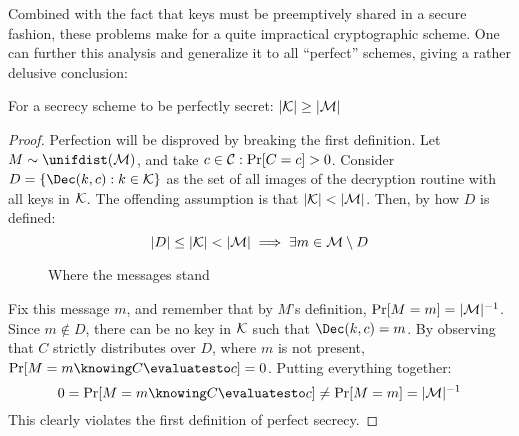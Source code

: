 
Combined with the fact that keys must be preemptively shared in a secure fashion, these problems make for a quite impractical cryptographic scheme. One can further this analysis and generalize it to all ``perfect'' schemes, giving a rather delusive conclusion:

\begin{theorem}
    For a secrecy scheme to be perfectly secret: $|\mathcal{K}| \geq |\mathcal{M}|$
\end{theorem}
\begin{proof}
    Perfection will be disproved by breaking the first definition. Let $M \sim \unifdist(\M)$, and take $c \in \mathcal{C} : \Pr[C = c] > 0$. Consider $D = \{\Dec(k, c) : k \in \K\}$ as the set of all images of the decryption routine with all keys in $\mathcal{K}$. The offending assumption is that $|\mathcal{K}| < |\mathcal{M}|$. Then, by how $D$ is defined:
    \[
        |D| \leq |\mathcal{K}| < |\mathcal{M}| \implies \exists m \in \mathcal{M} \setminus D
    \]

    \begin{figure}[h]
        \centering
        \def\firstcircle{(0,0) circle (1.5cm)}
        \def\secondcircle{(60:0) circle (0.9cm)}
        \caption{Where the messages stand}
    \end{figure}

    Fix this message $m$, and remember that by $M$'s definition, $\Pr[M = m] = |\mathcal{M}|^{-1}$. Since $m \notin D$, there can be no key in $\mathcal{K}$ such that $\Dec(k, c) = m$. By observing that $C$ strictly distributes over $D$, where $m$ is not present, $\Pr[M = m \knowing C \evaluatesto c] = 0$. Putting everything together:
    \[
        0 = \Pr[M = m \knowing C \evaluatesto c] \neq \Pr[M = m] = |\M|^{-1}
    \]
    This clearly violates the first definition of perfect secrecy.
\end{proof}
